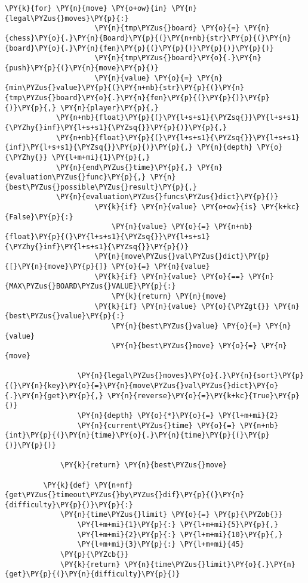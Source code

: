 \begin{Verbatim}[commandchars=\\\{\}]
                 \PY{k}{for} \PY{n}{move} \PY{o+ow}{in} \PY{n}{legal\PYZus{}moves}\PY{p}{:}
                     \PY{n}{tmp\PYZus{}board} \PY{o}{=} \PY{n}{chess}\PY{o}{.}\PY{n}{Board}\PY{p}{(}\PY{n+nb}{str}\PY{p}{(}\PY{n}{board}\PY{o}{.}\PY{n}{fen}\PY{p}{(}\PY{p}{)}\PY{p}{)}\PY{p}{)}
                     \PY{n}{tmp\PYZus{}board}\PY{o}{.}\PY{n}{push}\PY{p}{(}\PY{n}{move}\PY{p}{)}
                     \PY{n}{value} \PY{o}{=} \PY{n}{min\PYZus{}value}\PY{p}{(}\PY{n+nb}{str}\PY{p}{(}\PY{n}{tmp\PYZus{}board}\PY{o}{.}\PY{n}{fen}\PY{p}{(}\PY{p}{)}\PY{p}{)}\PY{p}{,} \PY{n}{player}\PY{p}{,} 
			\PY{n+nb}{float}\PY{p}{(}\PY{l+s+s1}{\PYZsq{}}\PY{l+s+s1}{\PYZhy{}inf}\PY{l+s+s1}{\PYZsq{}}\PY{p}{)}\PY{p}{,} 
			\PY{n+nb}{float}\PY{p}{(}\PY{l+s+s1}{\PYZsq{}}\PY{l+s+s1}{inf}\PY{l+s+s1}{\PYZsq{}}\PY{p}{)}\PY{p}{,} \PY{n}{depth} \PY{o}{\PYZhy{}} \PY{l+m+mi}{1}\PY{p}{,} 
			\PY{n}{end\PYZus{}time}\PY{p}{,} \PY{n}{evaluation\PYZus{}func}\PY{p}{,} \PY{n}{best\PYZus{}possible\PYZus{}result}\PY{p}{,} 
			\PY{n}{evaluation\PYZus{}funcs\PYZus{}dict}\PY{p}{)}
                     \PY{k}{if} \PY{n}{value} \PY{o+ow}{is} \PY{k+kc}{False}\PY{p}{:}
                         \PY{n}{value} \PY{o}{=} \PY{n+nb}{float}\PY{p}{(}\PY{l+s+s1}{\PYZsq{}}\PY{l+s+s1}{\PYZhy{}inf}\PY{l+s+s1}{\PYZsq{}}\PY{p}{)}
                     \PY{n}{move\PYZus{}val\PYZus{}dict}\PY{p}{[}\PY{n}{move}\PY{p}{]} \PY{o}{=} \PY{n}{value}
                     \PY{k}{if} \PY{n}{value} \PY{o}{==} \PY{n}{MAX\PYZus{}BOARD\PYZus{}VALUE}\PY{p}{:}
                         \PY{k}{return} \PY{n}{move}
                     \PY{k}{if} \PY{n}{value} \PY{o}{\PYZgt{}} \PY{n}{best\PYZus{}value}\PY{p}{:}
                         \PY{n}{best\PYZus{}value} \PY{o}{=} \PY{n}{value}
                         \PY{n}{best\PYZus{}move} \PY{o}{=} \PY{n}{move}
         
                 \PY{n}{legal\PYZus{}moves}\PY{o}{.}\PY{n}{sort}\PY{p}{(}\PY{n}{key}\PY{o}{=}\PY{n}{move\PYZus{}val\PYZus{}dict}\PY{o}{.}\PY{n}{get}\PY{p}{,} \PY{n}{reverse}\PY{o}{=}\PY{k+kc}{True}\PY{p}{)}
                 \PY{n}{depth} \PY{o}{*}\PY{o}{=} \PY{l+m+mi}{2}
                 \PY{n}{current\PYZus{}time} \PY{o}{=} \PY{n+nb}{int}\PY{p}{(}\PY{n}{time}\PY{o}{.}\PY{n}{time}\PY{p}{(}\PY{p}{)}\PY{p}{)}
         
             \PY{k}{return} \PY{n}{best\PYZus{}move}
         
         \PY{k}{def} \PY{n+nf}{get\PYZus{}timeout\PYZus{}by\PYZus{}dif}\PY{p}{(}\PY{n}{difficulty}\PY{p}{)}\PY{p}{:}
             \PY{n}{time\PYZus{}limit} \PY{o}{=} \PY{p}{\PYZob{}}
                 \PY{l+m+mi}{1}\PY{p}{:} \PY{l+m+mi}{5}\PY{p}{,}
                 \PY{l+m+mi}{2}\PY{p}{:} \PY{l+m+mi}{10}\PY{p}{,}
                 \PY{l+m+mi}{3}\PY{p}{:} \PY{l+m+mi}{45}
             \PY{p}{\PYZcb{}}
             \PY{k}{return} \PY{n}{time\PYZus{}limit}\PY{o}{.}\PY{n}{get}\PY{p}{(}\PY{n}{difficulty}\PY{p}{)}
\end{Verbatim}

